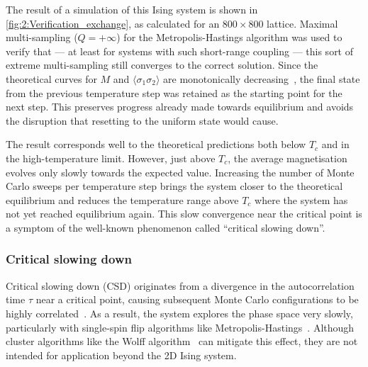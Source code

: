 The result of a \hotspice simulation of this Ising system is shown in \cref{fig:2:Verification_exchange}, as calculated for an $800 \times 800$ lattice.
Maximal multi-sampling ($Q=+\infty$) for the Metropolis-Hastings algorithm was used to verify that --- at least for systems with such short-range coupling --- this sort of extreme multi-sampling still converges to the correct solution.
Since the theoretical curves for $M$ and $\langle \sigma_{1} \sigma_{2} \rangle$ are monotonically decreasing~\cite{MCinStatPhys}, the final state from the previous temperature step was retained as the starting point for the next step. This preserves progress already made towards equilibrium and avoids the disruption that resetting to the uniform state would cause. \par


The \hotspice result corresponds well to the theoretical predictions both below $T_c$ and in the high-temperature limit.
However, just above $T_c$, the average magnetisation evolves only slowly towards the expected value.
Increasing the number of Monte Carlo sweeps per temperature step brings the system closer to the theoretical equilibrium and reduces the temperature range above $T_c$ where the system has not yet reached equilibrium again.
This slow convergence near the critical point is a symptom of the well-known phenomenon called ``critical slowing down''.

\subsubsection{Critical slowing down}
Critical slowing down (CSD) originates from a divergence in the autocorrelation time $\tau$ near a critical point, causing subsequent Monte Carlo configurations to be highly correlated~\cite{NumericalDynamicalNiedermayer,CompStatPhys,StatisticalMechanicsAlgorithmsComputations}.
As a result, the system explores the phase space very slowly, particularly with single-spin flip algorithms like Metropolis-Hastings~\cite{StatisticalMechanicsAlgorithmsComputations}.
Although cluster algorithms like the Wolff algorithm~\cite{Wolff} can mitigate this effect, they are not intended for application beyond the 2D Ising system.
